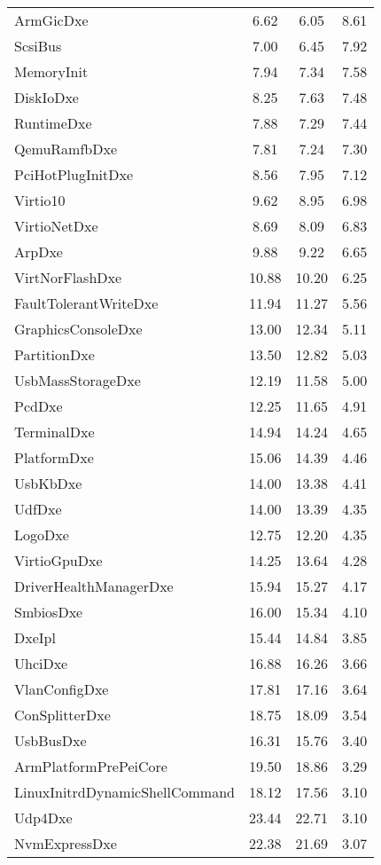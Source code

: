 \begin{longtable}{l c c c}
  ArmGicDxe & 6.62 & 6.05 & 8.61\\
  ScsiBus & 7.00 & 6.45 & 7.92\\
  MemoryInit & 7.94 & 7.34 & 7.58\\
  DiskIoDxe & 8.25 & 7.63 & 7.48\\
  RuntimeDxe & 7.88 & 7.29 & 7.44\\
  QemuRamfbDxe & 7.81 & 7.24 & 7.30\\
  PciHotPlugInitDxe & 8.56 & 7.95 & 7.12\\
  Virtio10 & 9.62 & 8.95 & 6.98\\
  VirtioNetDxe & 8.69 & 8.09 & 6.83\\
  ArpDxe & 9.88 & 9.22 & 6.65\\
  VirtNorFlashDxe & 10.88 & 10.20 & 6.25\\
  FaultTolerantWriteDxe & 11.94 & 11.27 & 5.56\\
  GraphicsConsoleDxe & 13.00 & 12.34 & 5.11\\
  PartitionDxe & 13.50 & 12.82 & 5.03\\
  UsbMassStorageDxe & 12.19 & 11.58 & 5.00\\
  PcdDxe & 12.25 & 11.65 & 4.91\\
  TerminalDxe & 14.94 & 14.24 & 4.65\\
  PlatformDxe & 15.06 & 14.39 & 4.46\\
  UsbKbDxe & 14.00 & 13.38 & 4.41\\
  UdfDxe & 14.00 & 13.39 & 4.35\\
  LogoDxe & 12.75 & 12.20 & 4.35\\
  VirtioGpuDxe & 14.25 & 13.64 & 4.28\\
  DriverHealthManagerDxe & 15.94 & 15.27 & 4.17\\
  SmbiosDxe & 16.00 & 15.34 & 4.10\\
  DxeIpl & 15.44 & 14.84 & 3.85\\
  UhciDxe & 16.88 & 16.26 & 3.66\\
  VlanConfigDxe & 17.81 & 17.16 & 3.64\\
  ConSplitterDxe & 18.75 & 18.09 & 3.54\\
  UsbBusDxe & 16.31 & 15.76 & 3.40\\
  ArmPlatformPrePeiCore & 19.50 & 18.86 & 3.29\\
  LinuxInitrdDynamicShellCommand & 18.12 & 17.56 & 3.10\\
  Udp4Dxe & 23.44 & 22.71 & 3.10\\
  NvmExpressDxe & 22.38 & 21.69 & 3.07\\

\end{longtable}

